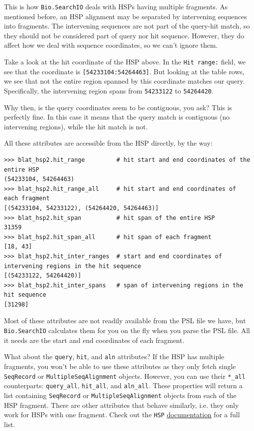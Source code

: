 \documentclass{report}
\begin{document}
This is how \verb|Bio.SearchIO| deals with HSPs having multiple fragments. As
mentioned before, an HSP alignment may be separated by intervening sequences
into fragments. The intervening sequences are not part of the query-hit match,
so they should not be considered part of query nor hit sequence. However, they
do affect how we deal with sequence coordinates, so we can't ignore them.

Take a look at the hit coordinate of the HSP above. In the \verb|Hit range:| field,
we see that the coordinate is \verb|[54233104:54264463]|. But looking at the
table rows, we see that not the entire region spanned by this coordinate matches
our query. Specifically, the intervening region spans from \verb|54233122| to
\verb|54264420|.

Why then, is the query coordinates seem to be contiguous, you ask? This is
perfectly fine. In this case it means that the query match is contiguous (no
intervening regions), while the hit match is not.

All these attributes are accessible from the HSP directly, by the way:

\begin{verbatim}
>>> blat_hsp2.hit_range         # hit start and end coordinates of the entire HSP
(54233104, 54264463)
>>> blat_hsp2.hit_range_all     # hit start and end coordinates of each fragment
[(54233104, 54233122), (54264420, 54264463)]
>>> blat_hsp2.hit_span          # hit span of the entire HSP
31359
>>> blat_hsp2.hit_span_all      # hit span of each fragment
[18, 43]
>>> blat_hsp2.hit_inter_ranges  # start and end coordinates of intervening regions in the hit sequence
[(54233122, 54264420)]
>>> blat_hsp2.hit_inter_spans   # span of intervening regions in the hit sequence
[31298]
\end{verbatim}

Most of these attributes are not readily available from the PSL file we have,
but \verb|Bio.SearchIO| calculates them for you on the fly when you parse the
PSL file. All it needs are the start and end coordinates of each fragment.

What about the \verb|query|, \verb|hit|, and \verb|aln| attributes? If the
HSP has multiple fragments, you won't be able to use these attributes as they
only fetch single \verb|SeqRecord| or \verb|MultipleSeqAlignment| objects.
However, you can use their \verb|*_all| counterparts: \verb|query_all|,
\verb|hit_all|, and \verb|aln_all|. These properties will return a list containing
\verb|SeqRecord| or \verb|MultipleSeqAlignment| objects from each of the HSP
fragment. There are other attributes that behave similarly, i.e. they only work
for HSPs with one fragment. Check out the \verb|HSP| \href{http://biopython.org/DIST/docs/api/Bio.SearchIO._model.hsp-module.html}{documentation}
for a full list.
\end{document}

